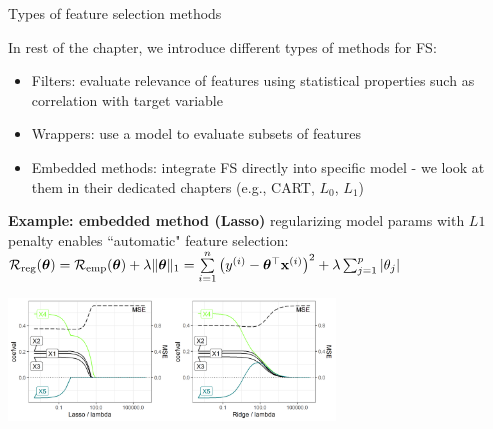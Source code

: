 \documentclass[11pt,compress,t,notes=noshow, xcolor=table]{beamer}
\begin{document}
  \begin{vbframe}{Types of feature selection methods}
 
  In rest of the chapter, we introduce different types of methods for FS:

  \begin{itemize}
    \item Filters: evaluate relevance of features using statistical properties such as correlation with target variable
    \item Wrappers: use a model to evaluate subsets of features
    \item Embedded methods: integrate FS directly into specific model - we look at them in their dedicated chapters (e.g., CART, $L_0$, $L_1$)
  \end{itemize}

      \textbf{Example: embedded method (Lasso)} regularizing model params with $L1$ penalty %
      enables ``automatic" feature selection:
      \vspace{-0.28cm}
      $ \mathcal{R}_{\text{reg}}(\bm{\theta}) = \mathcal{R}_{\text{emp}}(\bm{\theta}) + \lambda \|\bm{\theta}\|_1 = \sum\limits_{i=1}^n \left(y^{(i)} - \bm{\theta}^\top \mathbf{x}^{(i)} \right)^2 +\lambda \sum_{j=1}^p |\theta_j| $
\vspace{0.1cm}
  \begin{center}
  \includegraphics[width=0.65\textwidth]{figure/regu_example_lasso_ridge.png}
  \end{center}


  \end{vbframe}



  \endlecture
\end{document}
